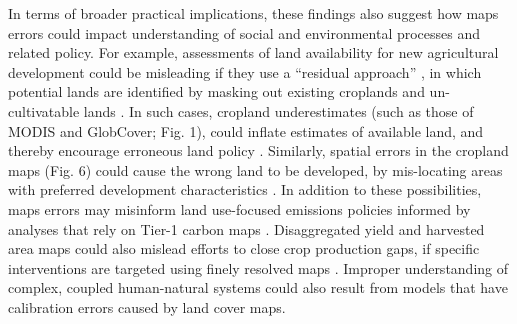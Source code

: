 \documentclass[12 pt, titlepage, a4paper]{article}
\begin{document}
In terms of broader practical implications, these findings also suggest how maps errors could impact understanding of social and environmental processes and related policy. For example, assessments of land availability for new agricultural development could be misleading if they use a ``residual approach'' \citep{lambin_estimating_2013}, in which potential lands are identified by masking out existing croplands and un-cultivatable lands \citep[e.g.][]{estes_reconciling_2016}. In such cases, cropland underestimates (such as those of MODIS and GlobCover; Fig. 1), could inflate estimates of available land, and thereby encourage erroneous land policy \citep{rulli_global_2013}. Similarly, spatial errors in the cropland maps (Fig. 6) could cause the wrong land to be developed, by mis-locating areas with preferred development characteristics \citep[e.g. high agricultural potential and low environmental cost;][]{estes_reconciling_2016, gasparri_emerging_2015}. In addition to these possibilities, maps errors may misinform land use-focused emissions policies informed by analyses that rely on Tier-1 carbon maps \citep[e.g.][]{phelps_agricultural_2013,cattaneo_international_2010}. Disaggregated yield and harvested area maps could also mislead efforts to close crop production gaps, if specific interventions are targeted using finely resolved maps \citep[e.g. the 10 km map shown in Figure 3 in ][]{foley_solutions_2011}. Improper understanding of complex, coupled human-natural systems could also result from models that have calibration errors caused by land cover maps. 

\vspace{-0.3 cm}
\end{document}
